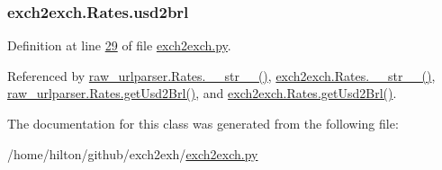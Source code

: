 \subsubsection[{\texorpdfstring{usd2brl}{usd2brl}}]{\setlength{\rightskip}{0pt plus 5cm}exch2exch.\+Rates.\+usd2brl}\hypertarget{classexch2exch_1_1_rates_ab79ad6e4a42ca358e6b39c825a4b8a0b}{}\label{classexch2exch_1_1_rates_ab79ad6e4a42ca358e6b39c825a4b8a0b}


Definition at line \hyperlink{exch2exch_8py_source_l00029}{29} of file \hyperlink{exch2exch_8py_source}{exch2exch.\+py}.



Referenced by \hyperlink{raw__urlparser_8py_source_l00038}{raw\+\_\+urlparser.\+Rates.\+\_\+\+\_\+str\+\_\+\+\_\+()}, \hyperlink{exch2exch_8py_source_l00042}{exch2exch.\+Rates.\+\_\+\+\_\+str\+\_\+\+\_\+()}, \hyperlink{raw__urlparser_8py_source_l00032}{raw\+\_\+urlparser.\+Rates.\+get\+Usd2\+Brl()}, and \hyperlink{exch2exch_8py_source_l00036}{exch2exch.\+Rates.\+get\+Usd2\+Brl()}.



The documentation for this class was generated from the following file\+:\begin{DoxyCompactItemize}
\item 
/home/hilton/github/exch2exh/\hyperlink{exch2exch_8py}{exch2exch.\+py}\end{DoxyCompactItemize}
